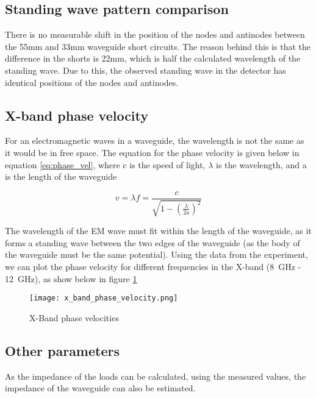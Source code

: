 \subsection*{Standing wave pattern comparison}
There is no measurable shift in the position of the nodes and antinodes between the 55mm and 33mm waveguide short circuits. The reason behind this is that the difference in the shorts is 22mm, which is half the calculated wavelength of the standing wave. Due to this, the observed standing wave in the detector has identical positions of the nodes and antinodes.

\subsection*{X-band phase velocity}
For an electromagnetic waves in a waveguide, the wavelength is not the same as it would be in free space. The equation for the phase velocity is given below in equation \ref{eq:phase_vel}, where c is the speed of light, $\lambda$ is the wavelength, and a is the length of the waveguide

\begin{equation}
\label{eq:phase_vel}
v=\lambda f = \frac{c}{\sqrt{1-(\frac{\lambda}{2a})^2}}
\end{equation}

The wavelength of the EM wave must fit within the length of the waveguide, as it forms a standing wave between the two edges of the waveguide (as the body of the waveguide must be the same potential). Using the data from the experiment, we can plot the phase velocity for different frequencies in the X-band (\SI{8}{\giga\hertz} - \SI{12}{\giga\hertz}), as show below in figure \ref{fig:xband_phase_vel}

\begin{figure}[H]
	\begin{center}
		\texttt{[image: x\_band\_phase\_velocity.png]}
		\caption{X-Band phase velocities}
		\label{fig:xband_phase_vel}
	\end{center}
\end{figure}

\subsection*{Other parameters}
As the impedance of the loads can be calculated, using the measured values, the impedance of the waveguide can also be estimated. 
